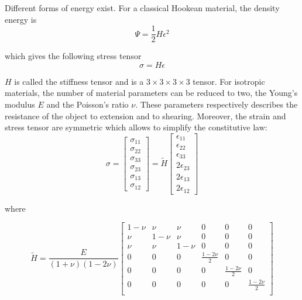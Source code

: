 Different forms of energy exist. For a classical Hookean material, the density energy is
\begin{equation}
\Psi = \frac{1}{2}H\epsilon^{2}
\end{equation}

which gives the following stress tensor
\begin{equation}
\sigma = H\epsilon
\end{equation}

$H$ is called the stiffness tensor and is a $3\times3\times3\times3$ tensor. 
For isotropic materials, the number of material parameters can be reduced to two, the Young's modulus $E$ and the Poisson's ratio $\nu$. 
These parameters respectively describes the resistance of the object to extension and to shearing.
Moreover, the strain and stress tensor are symmetric which allows to simplify the constitutive law:
\begin{equation}
\sigma = 
\begin{bmatrix}
\sigma_{11} \\
\sigma_{22} \\
\sigma_{33} \\
\sigma_{23} \\
\sigma_{13} \\
\sigma_{12}
\end{bmatrix}
=
\tilde{H}
\begin{bmatrix}
\epsilon_{11} \\
\epsilon_{22} \\
\epsilon_{33} \\
2\epsilon_{23} \\
2\epsilon_{13} \\
2\epsilon_{12}
\end{bmatrix}
\end{equation}

where

\begin{equation}
\tilde{H} =
\frac{E}{\left(1+\nu\right)\left(1-2\nu\right)}
\begin{bmatrix}
1-\nu & \nu & \nu & 0 & 0 & 0 \\ 
\nu & 1-\nu & \nu & 0 & 0 & 0 \\
\nu & \nu & 1-\nu & 0 & 0 & 0 \\
0 & 0 & 0 & \frac{1-2\nu}{2} & 0 & 0 \\
0 & 0 & 0 & 0 & \frac{1-2\nu}{2} & 0 \\
0 & 0 & 0 & 0 & 0 & \frac{1-2\nu}{2} \\
\end{bmatrix}
\end{equation}

